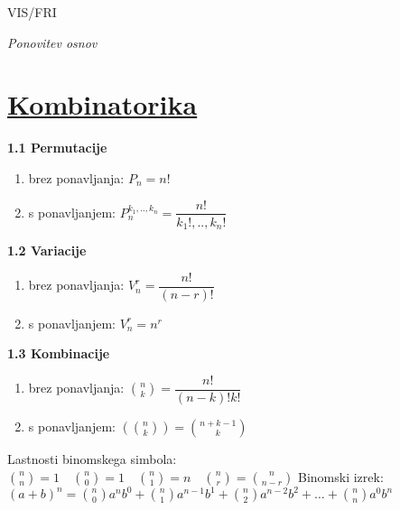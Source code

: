 \documentclass{article}
\begin{document}
\begin{center}
    {\small VIS/FRI \par}
\end{center}

\begin{multicols}{3}

\textit{Ponovitev osnov}

\section{\underline{Kombinatorika}}


\textbf{1.1 Permutacije}
\begin{small}
    \begin{enumerate}
        \item brez ponavljanja: $P_{n} = n!$
        \item s ponavljanjem: $P_{n}^{k_{1},..,k_{n}} = \dfrac{n!}{k_{1}!,..,k_{n}!}$
    \end{enumerate}        
\end{small}

\textbf{1.2 Variacije}
    \begin{small}
        \begin{enumerate}
            \item brez ponavljanja: $V_{n}^{r} = \dfrac{n!}{(n - r)!}$
            \item s ponavljanjem: $V_{n}^{r} = n^{r}$
        \end{enumerate}                
    \end{small}

\textbf{1.3 Kombinacije}
\begin{small}
    \begin{enumerate}
        \item brez ponavljanja: ${n\choose k} = \dfrac{n!}{(n - k)! k!}$
        \item s ponavljanjem: $({n\choose k}) = {n + k - 1\choose k}$
    \end{enumerate}
    \begin{center}
        Lastnosti binomskega simbola:
        \begin{math}
            {n \choose n} = 1 \quad
            {n \choose 0} = 1 \quad
            {n \choose 1} = n \quad
            {n \choose r} = {n \choose n - r} 
        \end{math}
        Binomski izrek:\\
        \begin{math}
            (a + b)^{n} =
            {n \choose 0} a^{n} b^{0} + {n \choose 1} a^{n - 1} b^{1} +
            {n \choose 2} a^{n - 2} b^{2} + \dots + {n \choose n} a^{0} b^{n}
        \end{math}
    

\end{center}
\end{small}
\end{multicols}
\end{document}
